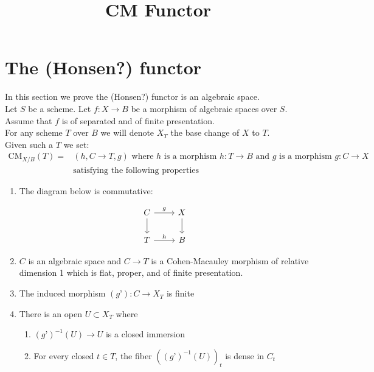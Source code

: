 \documentclass{article}
\title{
    \textmd{\textbf{CM Functor}}\\
}
\author{}
\date{}
\theoremstyle{definition}
\theoremstyle{theorem}
\theoremstyle{remark}
\theoremstyle{definition}
\newcommand{\CMfunctor}{\text{CM}}
\begin{document}
\maketitle

\section{The (Honsen?) functor}
\label{section-cm}

\noindent
In this section we prove the (Honsen?) functor is an algebraic space.\\

Let $S$ be a scheme. Let $f : X \to B$ be a morphism of
algebraic spaces over $S$. Assume that $f$ is of separated and of finite presentation.\\

For any scheme $T$ over $B$ we will denote $X_T$ the base change of $X$ to $T$.\\

Given such a $T$ we set:
\begin{align*}
\CMfunctor_{X/B}(T) = & (h, C \to T, g)  \text{ where } 
h \text{ is a morphism } h : T \to B \text{ and } g \text{ is a morphism } g : C \to X \\ & \text{satisfying the following properties}
\end{align*}
\begin{enumerate}
\item The diagram below is commutative: 

\[ \begin{tikzcd}
C \arrow{r}{g} \arrow{d} & X \arrow{d} \\%
T \arrow{r}{h}& B
\end{tikzcd}
\]

\item $C$ is an algebraic space and $C \to T$ is a Cohen-Macauley morphism of relative dimension 1 which is flat, proper, and of finite presentation.
\item The induced morphism $(g’) : C \to X_T$ is finite
\item There is an open $U \subset X_T$ where
\begin{enumerate}
\item $(g’)^{-1}(U) \to U$ is a closed immersion
\item For every closed $t \in T$, the fiber $\left((g’)^{-1}(U)\right)_t$ is dense in $C_t$
\end{enumerate}
\end{enumerate}
\end{document}
